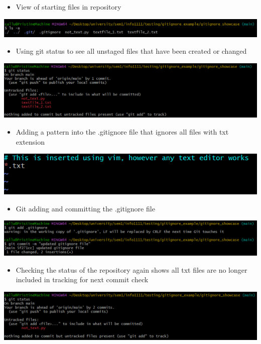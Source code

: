 \documentclass[a4paper, 11pt]{report}
\begin{document}
\begin{itemize}
\item View of starting files in repository 
\end{itemize}
\includegraphics[width=1.1\textwidth]{gitignorestartingfiles}
\begin{itemize}
\item Using git status to see all unstaged files that have been created or changed 
\end{itemize}
\includegraphics[width=1.1\textwidth]{gitignoreinitialstatus}
\begin{itemize}
\item Adding a pattern into the .gitignore file that ignores all files with txt extension  
\end{itemize}
\includegraphics[width=1.1\textwidth]{gitignorevim}
\begin{itemize}
\item Git adding and committing the .gitignore file 
\end{itemize}
\includegraphics[width=1.1\textwidth]{gitignorecommit}
\begin{itemize}
\item Checking the status of the repository again shows all txt files are no longer included in tracking for next commit check 
\end{itemize}
\includegraphics[width=1.1\textwidth]{gitignorefinalstatus}
\end{document}
